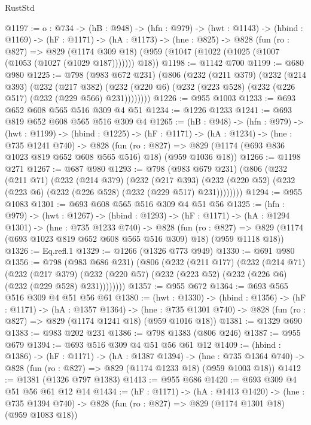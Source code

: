 \begin{lexlean}{RustStd}
\begin{coremodule}
{\begin{coremodule}
@1197 := {o : @734} ->
  (hB : @948) ->
  (hfn : @979) ->
  (hwt : @1143) ->
  (hbind : @1169) ->
  (hF : @1171) ->
  (hA : @1173) ->
  (hne : @825) ->
  @828
    (fun (ro : @827) =>
    @829 (@1174 @309 @18) (@959 (@1047 (@1022 (@1025 (@1007 (@1053 (@1027 (@1029 @187))))))) @18))
@1198 := @1142 @700
@1199 := @680 @980
@1225 := @798
    (@983 @672 @231)
    (@806
      (@232
        (@211 @379)
        (@232
          (@214 @393)
          (@232
            (@217 @382)
            (@232 (@220 @6) (@232 (@223 @528) (@232 (@226 @517) (@232 (@229 @566) @231))))))))
@1226 := @955 @1003
@1233 := @693 @652 @608 @565 @516 @309 @4 @51
@1234 := @1226 @1233
@1241 := @693 @819 @652 @608 @565 @516 @309 @4
@1265 := (hB : @948) ->
  (hfn : @979) ->
  (hwt : @1199) ->
  (hbind : @1225) ->
  (hF : @1171) ->
  (hA : @1234) ->
  (hne : @735 @1241 @740) ->
  @828
    (fun (ro : @827) =>
    @829 (@1174 (@693 @836 @1023 @819 @652 @608 @565 @516) @18) (@959 @1036 @18))
@1266 := @1198 @271
@1267 := @687 @980
@1293 := @798
    (@983 @679 @231)
    (@806
      (@232
        (@211 @71)
        (@232
          (@214 @379)
          (@232
            (@217 @393)
            (@232 (@220 @52) (@232 (@223 @6) (@232 (@226 @528) (@232 (@229 @517) @231))))))))
@1294 := @955 @1083
@1301 := @693 @608 @565 @516 @309 @4 @51 @56
@1325 := (hfn : @979) ->
  (hwt : @1267) ->
  (hbind : @1293) ->
  (hF : @1171) ->
  (hA : @1294 @1301) ->
  (hne : @735 @1233 @740) ->
  @828
    (fun (ro : @827) =>
    @829 (@1174 (@693 @1023 @819 @652 @608 @565 @516 @309) @18) (@959 @1118 @18))
@1326 := Eq.refl.{1}
@1329 := @1266 (@1326 @773 @949)
@1330 := @691 @980
@1356 := @798
    (@983 @686 @231)
    (@806
      (@232
        (@211 @177)
        (@232
          (@214 @71)
          (@232
            (@217 @379)
            (@232 (@220 @57) (@232 (@223 @52) (@232 (@226 @6) (@232 (@229 @528) @231))))))))
@1357 := @955 @672
@1364 := @693 @565 @516 @309 @4 @51 @56 @61
@1380 := (hwt : @1330) ->
  (hbind : @1356) ->
  (hF : @1171) ->
  (hA : @1357 @1364) ->
  (hne : @735 @1301 @740) -> @828 (fun (ro : @827) => @829 (@1174 @1241 @18) (@959 @1016 @18))
@1381 := @1329 @690
@1383 := @983 @202 @231
@1386 := @798 @1383 (@806 @246)
@1387 := @955 @679
@1394 := @693 @516 @309 @4 @51 @56 @61 @12
@1409 := (hbind : @1386) ->
  (hF : @1171) ->
  (hA : @1387 @1394) ->
  (hne : @735 @1364 @740) -> @828 (fun (ro : @827) => @829 (@1174 @1233 @18) (@959 @1003 @18))
@1412 := @1381 (@1326 @797 @1383)
@1413 := @955 @686
@1420 := @693 @309 @4 @51 @56 @61 @12 @14
@1434 := (hF : @1171) ->
  (hA : @1413 @1420) ->
  (hne : @735 @1394 @740) -> @828 (fun (ro : @827) => @829 (@1174 @1301 @18) (@959 @1083 @18))

\end{coremodule}}
\end{coremodule}
\end{lexlean}

